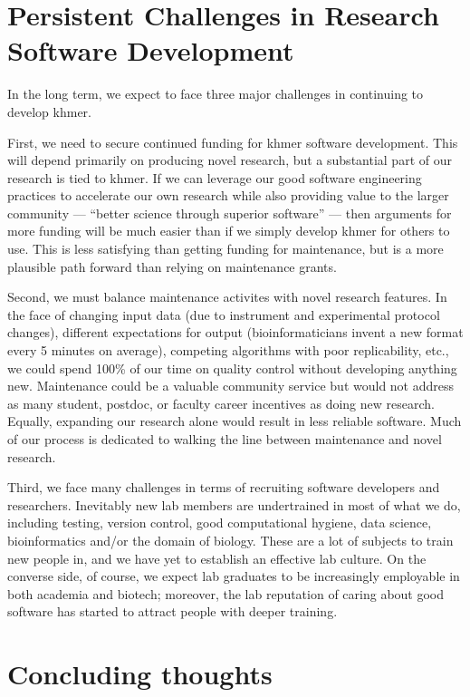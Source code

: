\documentclass[12pt]{article}
\begin{document}
\section{Persistent Challenges in Research Software Development}

In the long term, we expect to face three major challenges in continuing
to develop khmer.

First, we need to secure continued funding for khmer software
development.  This will depend primarily on producing novel research,
but a substantial part of our research is tied to khmer.  If we can
leverage our good software engineering practices to accelerate our own
research while also providing value to the larger community ---
``better science through superior software'' --- then arguments for more
funding will be much easier than if we simply develop khmer for
others to use.  This is less satisfying than getting funding for maintenance,
but is a more plausible path forward than relying on maintenance grants.

Second, we must balance maintenance activites with novel research
features.  In the face of changing input data (due to instrument and
experimental protocol changes), different expectations for output
(bioinformaticians invent a new format every 5 minutes on average),
competing algorithms with poor replicability, etc., we could spend
100\% of our time on quality control without developing anything new.
Maintenance could be a valuable community service but would not address
as many student, postdoc, or faculty career incentives as doing new
research.  Equally, expanding our research alone would result in less
reliable software.  Much of our process is dedicated to walking the
line between maintenance and novel research.

Third, we face many challenges in terms of recruiting software
developers and researchers.  Inevitably new lab members are
undertrained in most of what we do, including testing, version
control, good computational hygiene, data science, bioinformatics
and/or the domain of biology.  These are a lot of subjects to train
new people in, and we have yet to establish an effective lab culture.
On the converse side, of course, we expect lab graduates to be
increasingly employable in both academia and biotech; moreover, the
lab reputation of caring about good software has started to attract
people with deeper training.

\section{Concluding thoughts}
\end{document}
